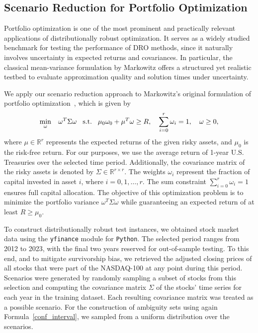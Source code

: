 \documentclass{article}
\begin{document}
\subsection{Scenario Reduction for Portfolio Optimization}
\label{sec:port_opt} %
Portfolio optimization is one of the most prominent and practically relevant applications of distributionally robust optimization.
It serves as a widely studied benchmark for testing the performance of DRO methods, since it naturally involves uncertainty in expected returns and covariances.
In particular, the classical mean-variance formulation by Markowitz offers a structured yet realistic testbed to evaluate approximation quality and solution times under uncertainty.

We apply our scenario reduction approach to Markowitz's original formulation of portfolio optimization~\cite{markowitz}, which is given by
\begin{align*}
	\min_{\omega} \hspace{0.3cm} \omega^T \Sigma \omega \hspace{0.3cm}\text{s.t.} \hspace{0.3cm}\mu_0 \omega_0 + \mu^T \omega \geq R, \quad
	\sum_{i=0}^r \omega_i = 1, \quad \omega \geq 0,
\end{align*}
where \(\mu \in \mathbb{R}^r\) represents the expected returns of the given risky assets, and \(\mu_0\) is the risk-free return.
For our purposes, we use the average return of 1-year U.S. Treasuries over the selected time period.
Additionally, the covariance matrix of the risky assets is denoted by \(\Sigma \in \mathbb{R}^{r \times r}\).
The weights \(\omega_i\) represent the fraction of capital invested in asset \(i\), where \(i=0, 1, \ldots, r\).
The sum constraint \(\sum_{i=0}^r \omega_i = 1\) ensures full capital allocation.
The objective of this optimization problem is to minimize the portfolio variance \(\omega^T \Sigma \omega\) while guaranteeing an expected return of at least \(R \geq \mu_0\).



To construct distributionally robust test instances, we obtained stock market data using the \texttt{yfinance} module for \texttt{Python}.  
The selected period ranges from 2012 to 2023, with the final two years reserved for out-of-sample testing.  
To this end, and to mitigate survivorship bias, we retrieved the adjusted closing prices of all stocks that were part of the NASDAQ-100 at any point during this period.  
Scenarios were generated by randomly sampling a subset of stocks from this selection and computing the covariance matrix \(\Sigma\) of the stocks' time series for each year in the training dataset.  
Each resulting covariance matrix was treated as a possible scenario.  
For the construction of ambiguity sets using again Formula~\eqref{conf_interval}, we sampled from a uniform distribution over the scenarios.
\end{document}
